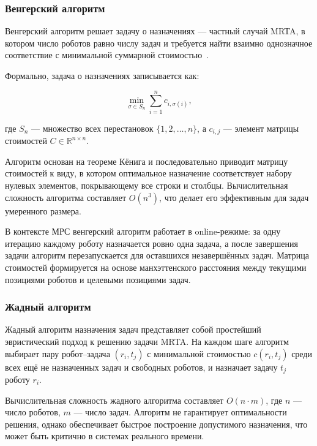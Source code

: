 \subsubsection{Венгерский алгоритм}

Венгерский алгоритм решает задачу о назначениях --- частный случай MRTA, в котором число роботов равно числу задач и требуется найти взаимно однозначное соответствие с минимальной суммарной стоимостью~\cite{kuhn1955hungarian}.

Формально, задача о назначениях записывается как:

\begin{equation}
    \label{eq:hungarian}
    \min_{\sigma \in S_n} \sum_{i=1}^{n} c_{i, \sigma(i)},
\end{equation}

где $S_n$ --- множество всех перестановок $\{1, 2, \ldots, n\}$, а $c_{i,j}$ --- элемент матрицы стоимостей $C \in \mathbb{R}^{n \times n}$.

Алгоритм основан на теореме Кёнига и последовательно приводит матрицу стоимостей к виду, в котором оптимальное назначение соответствует набору нулевых элементов, покрывающему все строки и столбцы. Вычислительная сложность алгоритма составляет $O(n^3)$, что делает его эффективным для задач умеренного размера.

В контексте МРС венгерский алгоритм работает в online-режиме: за одну итерацию каждому роботу назначается ровно одна задача, а после завершения задачи алгоритм перезапускается для оставшихся незавершённых задач. Матрица стоимостей формируется на основе манхэттенского расстояния между текущими позициями роботов и целевыми позициями задач.

\subsubsection{Жадный алгоритм}

Жадный алгоритм назначения задач представляет собой простейший эвристический подход к решению задачи MRTA. На каждом шаге алгоритм выбирает пару робот--задача $(r_i, t_j)$ с минимальной стоимостью $c(r_i, t_j)$ среди всех ещё не назначенных задач и свободных роботов, и назначает задачу $t_j$ роботу $r_i$.

Вычислительная сложность жадного алгоритма составляет $O(n \cdot m)$, где $n$ --- число роботов, $m$ --- число задач. Алгоритм не гарантирует оптимальности решения, однако обеспечивает быстрое построение допустимого назначения, что может быть критично в системах реального времени.

